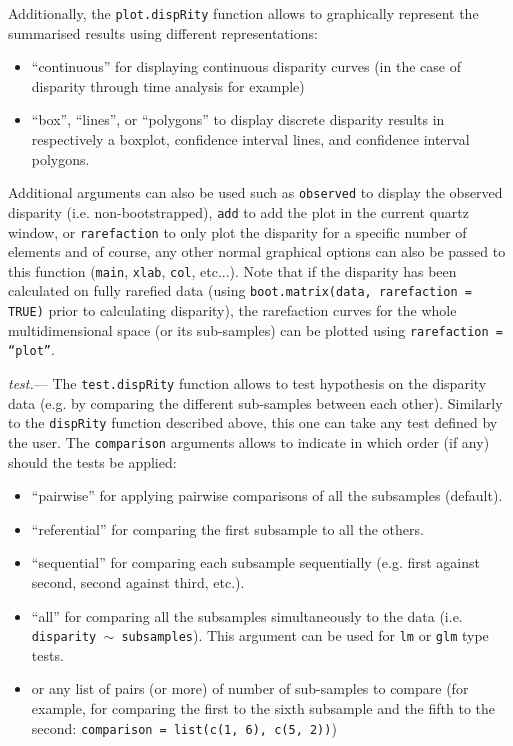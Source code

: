 \documentclass[12pt,letterpaper]{article}
\renewcommand{\subsubsection}[1]{%
\vspace{2ex}
\noindent
\textit{#1.}---}
\newcommand{\disp}{\texttt{dispRity} }
\begin{document}
Additionally, the \texttt{plot.dispRity} function allows to graphically represent the summarised results using different representations:

\begin{itemize}
    \item ``continuous'' for displaying continuous disparity curves (in the case of disparity through time analysis for example)
    \item ``box'', ``lines'', or ``polygons'' to display discrete disparity results in respectively a boxplot, confidence interval lines, and confidence interval polygons.
\end{itemize}

Additional arguments can also be used such as \texttt{observed} to display the observed disparity (i.e. non-bootstrapped), \texttt{add} to add the plot in the current quartz window, or \texttt{rarefaction} to only plot the disparity for a specific number of elements and of course, any other normal graphical options can also be passed to this function (\texttt{main}, \texttt{xlab}, \texttt{col}, etc...).
Note that if the disparity has been calculated on fully rarefied data (using \texttt{boot.matrix(data, rarefaction = TRUE)} prior to calculating disparity), the rarefaction curves for the whole multidimensional space (or its sub-samples) can be plotted using \texttt{rarefaction = ``plot''}.

\subsubsection{test}
The \texttt{test.dispRity} function allows to test hypothesis on the disparity data (e.g. by comparing the different sub-samples between each other).
Similarly to the \disp function described above, this one can take any test defined by the user.
The \texttt{comparison} arguments allows to indicate in which order (if any) should the tests be applied:

\begin{itemize}
    \item ``pairwise'' for applying pairwise comparisons of all the subsamples (default).
    \item ``referential'' for comparing the first subsample to all the others.
    \item ``sequential'' for comparing each subsample sequentially (e.g. first against second, second against third, etc.).
    \item ``all'' for comparing all the subsamples simultaneously to the data (i.e. \texttt{disparity $\mathtt{\sim}$ subsamples}). This argument can be used for \texttt{lm} or \texttt{glm} type tests.
    \item or any list of pairs (or more) of number of sub-samples to compare (for example, for comparing the first to the sixth subsample and the fifth to the second: \texttt{comparison = list(c(1, 6), c(5, 2))})
\end{itemize}
\end{document}
